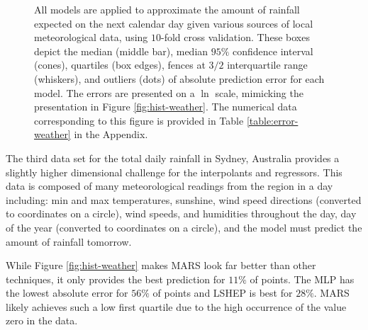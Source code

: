 \documentclass[smallextended,final]{svjour3}  %
\begin{document}
\begin{figure}
  \centering
  \caption{All models are applied to approximate the amount of
    rainfall expected on the next calendar day given various sources
    of local meteorological data, using $10$-fold cross validation.
    These boxes depict the median (middle bar), median $95\%$
    confidence interval (cones), quartiles (box edges), fences at
    $3/2$ interquartile range (whiskers), and outliers (dots) of
    absolute prediction error for each model. The errors are presented
    on a $\ln$ scale, mimicking the presentation in Figure
    \ref{fig:hist-weather}. The numerical data corresponding to this
    figure is provided in Table \ref{table:error-weather} in the
    Appendix.}
  \label{fig:error-weather}
\end{figure}

The third data set for the total daily rainfall in Sydney, Australia
\cite{williams2009rattle} provides a slightly higher dimensional
challenge for the interpolants and regressors. This data is composed
of many meteorological readings from the region in a day including:
min and max temperatures, sunshine, wind speed directions (converted
to coordinates on a circle), wind speeds, and humidities throughout
the day, day of the year (converted to coordinates on a circle), and
the model must predict the amount of rainfall tomorrow.

While Figure \ref{fig:hist-weather} makes MARS look far better than
other techniques, it only provides the best prediction for $11\%$ of
points. The MLP has the lowest absolute error for $56\%$ of points and
LSHEP is best for $28\%$. MARS likely achieves such a low first
quartile due to the high occurrence of the value zero in the data.
\end{document}
